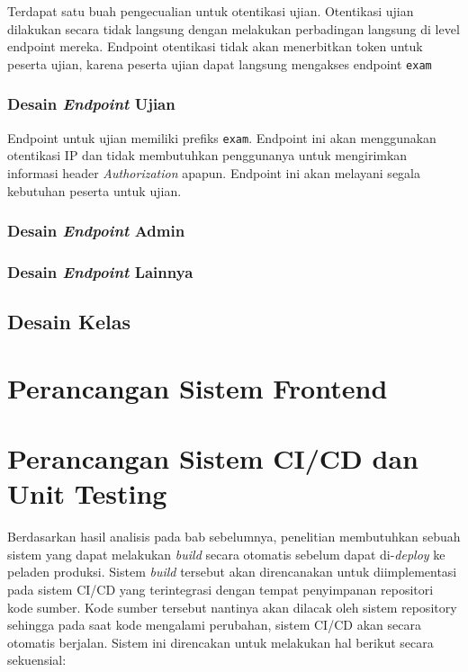     Terdapat satu buah pengecualian untuk otentikasi ujian. Otentikasi ujian dilakukan secara tidak
    langsung dengan melakukan perbadingan langsung di level endpoint mereka. Endpoint otentikasi
    tidak akan menerbitkan token untuk peserta ujian, karena peserta ujian dapat langsung
    mengakses endpoint \texttt{exam}
    
\subsubsection{Desain \textit{Endpoint} Ujian}
    Endpoint untuk ujian memiliki prefiks \texttt{exam}. Endpoint ini akan menggunakan otentikasi
    IP dan tidak membutuhkan penggunanya untuk mengirimkan informasi header \textit{Authorization}
    apapun. Endpoint ini akan melayani segala kebutuhan peserta untuk ujian.
    
\subsubsection{Desain \textit{Endpoint} Admin}
    
\subsubsection{Desain \textit{Endpoint} Lainnya}
    
\subsection{Desain Kelas}
    
\section{Perancangan Sistem Frontend}
    
    
\section{Perancangan Sistem CI/CD dan Unit Testing}
    Berdasarkan hasil analisis pada bab sebelumnya, penelitian membutuhkan sebuah sistem yang dapat
    melakukan \textit{build} secara otomatis sebelum dapat di-\textit{deploy} ke peladen produksi.
    Sistem \textit{build} tersebut akan direncanakan untuk diimplementasi pada sistem CI/CD yang
    terintegrasi dengan tempat penyimpanan repositori kode sumber. Kode sumber tersebut nantinya akan
    dilacak oleh sistem repository sehingga pada saat kode mengalami perubahan, sistem CI/CD akan
    secara otomatis berjalan. Sistem ini direncakan untuk melakukan hal berikut secara sekuensial:
    
